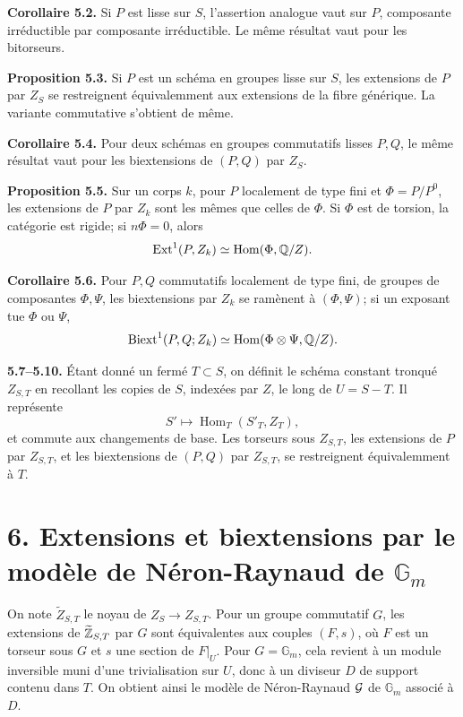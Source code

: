 \documentclass[11pt]{article}
\providecommand{\Gm}{\mathbb G_m}
\providecommand{\Hom}{\operatorname{Hom}}
\providecommand{\Ext}{\operatorname{Ext}}
\begin{document}
\textbf{Corollaire 5.2.}  Si \(P\) est lisse sur \(S\), l'assertion analogue vaut sur \(P\), composante irréductible par composante irréductible.  Le même résultat vaut pour les bitorseurs.

\textbf{Proposition 5.3.}  Si \(P\) est un schéma en groupes lisse sur \(S\), les extensions de \(P\) par \(Z_S\) se restreignent équivalemment aux extensions de la fibre générique.  La variante commutative s'obtient de même.

\textbf{Corollaire 5.4.}  Pour deux schémas en groupes commutatifs lisses \(P,Q\), le même résultat vaut pour les biextensions de \((P,Q)\) par \(Z_S\).

\textbf{Proposition 5.5.}  Sur un corps \(k\), pour \(P\) localement de type fini et \(\Phi=P/P^0\), les extensions de \(P\) par \(Z_k\) sont les mêmes que celles de \(\Phi\).  Si \(\Phi\) est de torsion, la catégorie est rigide; si \(n\Phi=0\), alors
\[
  \Ext^1(P,Z_k)\simeq \Hom(\Phi,\QQ/Z).
\]

\textbf{Corollaire 5.6.}  Pour \(P,Q\) commutatifs localement de type fini, de groupes de composantes \(\Phi,\Psi\), les biextensions par \(Z_k\) se ramènent à \((\Phi,\Psi)\); si un exposant tue \(\Phi\) ou \(\Psi\),
\[
  \Biext^1(P,Q;Z_k)\simeq \Hom(\Phi\otimes\Psi,\QQ/Z).
\]

\textbf{5.7--5.10.}  Étant donné un fermé \(T\subset S\), on définit le schéma constant tronqué \(Z_{S,T}\) en recollant les copies de \(S\), indexées par \(Z\), le long de \(U=S-T\).  Il représente
\[
  S'\longmapsto \Hom_T(S'_T,Z_T),
\]
et commute aux changements de base.  Les torseurs sous \(Z_{S,T}\), les extensions de \(P\) par \(Z_{S,T}\), et les biextensions de \((P,Q)\) par \(Z_{S,T}\), se restreignent équivalemment à \(T\).

\section*{6. Extensions et biextensions par le modèle de Néron-Raynaud de \(\Gm\)}

On note \(\widetilde Z_{S,T}\) le noyau de \(Z_S\to Z_{S,T}\).  Pour un groupe commutatif \(G\), les extensions de \(\widetilde{\mathbb Z}_{S,T}\) par \(G\) sont équivalentes aux couples \((F,s)\), où \(F\) est un torseur sous \(G\) et \(s\) une section de \(F|_U\).  Pour \(G=\Gm\), cela revient à un module inversible muni d'une trivialisation sur \(U\), donc à un diviseur \(D\) de support contenu dans \(T\).  On obtient ainsi le modèle de Néron-Raynaud \(\mathcal G\) de \(\Gm\) associé à \(D\).
\end{document}
